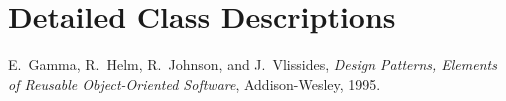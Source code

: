 \documentclass[11pt,a4paper]{report}
\begin{document}

\chapter{Detailed Class Descriptions}
%


\clearpage
\begin{thebibliography}{99}

  E.~Gamma, R.~Helm, R.~Johnson, and J.~Vlissides,
  \textit{Design Patterns, Elements of Reusable Object-Oriented
    Software},
  Addison-Wesley, 1995.

\end{thebibliography}

\end{document}
